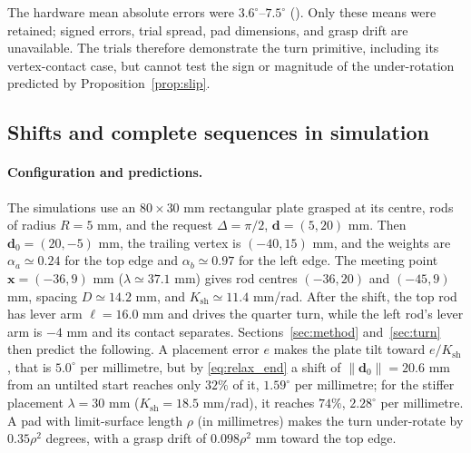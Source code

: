 The hardware mean absolute errors were $3.6^{\circ}$--$7.5^{\circ}$ (). Only these means were retained; signed errors, trial spread, pad dimensions, and grasp drift are unavailable. The trials therefore demonstrate the turn primitive, including its vertex-contact case, but cannot test the sign or magnitude of the under-rotation predicted by Proposition~\ref{prop:slip}.

\subsection{Shifts and complete sequences in simulation}
\label{sec:exp_tworod}

\paragraph{Configuration and predictions.}
The simulations use an $80\times30$ mm rectangular plate grasped at its centre, rods of radius $R=5$ mm, and the request $\Delta=\pi/2$, $\mathbf d=(5,20)$ mm. Then $\mathbf d_0=(20,-5)$ mm, the trailing vertex is $(-40,15)$ mm, and the weights are $\alpha_a\simeq0.24$ for the top edge and $\alpha_b\simeq0.97$ for the left edge. The meeting point $\mathbf x=(-36,9)$ mm ($\lambda\simeq37.1$ mm) gives rod centres $(-36,20)$ and $(-45,9)$ mm, spacing $D\simeq14.2$ mm, and $K_{\mathrm{sh}}\simeq11.4$ mm/rad. After the shift, the top rod has lever arm $\ell=16.0$ mm and drives the quarter turn, while the left rod's lever arm is $-4$ mm and its contact separates. Sections~\ref{sec:method} and~\ref{sec:turn} then predict the following. A placement error $e$ makes the plate tilt toward $e/K_{\mathrm{sh}}$, that is $5.0^{\circ}$ per millimetre, but by \eqref{eq:relax_end} a shift of $\|\mathbf d_0\|=20.6$ mm from an untilted start reaches only $32\%$ of it, $1.59^{\circ}$ per millimetre; for the stiffer placement $\lambda=30$ mm ($K_{\mathrm{sh}}=18.5$ mm/rad), it reaches $74\%$, $2.28^{\circ}$ per millimetre. A pad with limit-surface length $\rho$ (in millimetres) makes the turn under-rotate by $0.35\rho^2$ degrees, with a grasp drift of $0.098\rho^2$ mm toward the top edge.

